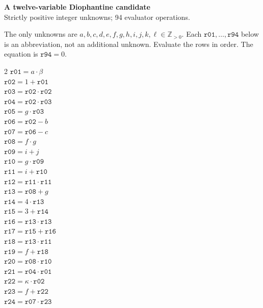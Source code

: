 \documentclass[10pt]{article}
\begin{document}
\begin{center}
{\large\bfseries A twelve-variable Diophantine candidate}\\
{\small Strictly positive integer unknowns; 94 evaluator operations.}
\end{center}
The only unknowns are \(a,b,c,d,e,f,g,h,i,j,k,\ell\in\mathbb Z_{>0}\).
Each \(\mathtt{r01},\ldots,\mathtt{r94}\) below is an abbreviation,
not an additional unknown. Evaluate the rows in order. The equation is
\(\boxed{\mathtt{r94}=0}\).

\begin{multicols}{2}\small
\(\mathtt{r01} = a \cdot \beta\)\\
\(\mathtt{r02} = 1 + \mathtt{r01}\)\\
\(\mathtt{r03} = \mathtt{r02} \cdot \mathtt{r02}\)\\
\(\mathtt{r04} = \mathtt{r02} \cdot \mathtt{r03}\)\\
\(\mathtt{r05} = g \cdot \mathtt{r03}\)\\
\(\mathtt{r06} = \mathtt{r02} - b\)\\
\(\mathtt{r07} = \mathtt{r06} - c\)\\
\(\mathtt{r08} = f \cdot g\)\\
\(\mathtt{r09} = i + j\)\\
\(\mathtt{r10} = g \cdot \mathtt{r09}\)\\
\(\mathtt{r11} = i + \mathtt{r10}\)\\
\(\mathtt{r12} = \mathtt{r11} \cdot \mathtt{r11}\)\\
\(\mathtt{r13} = \mathtt{r08} + g\)\\
\(\mathtt{r14} = 4 \cdot \mathtt{r13}\)\\
\(\mathtt{r15} = 3 + \mathtt{r14}\)\\
\(\mathtt{r16} = \mathtt{r13} \cdot \mathtt{r13}\)\\
\(\mathtt{r17} = \mathtt{r15} + \mathtt{r16}\)\\
\(\mathtt{r18} = \mathtt{r13} \cdot \mathtt{r11}\)\\
\(\mathtt{r19} = f + \mathtt{r18}\)\\
\(\mathtt{r20} = \mathtt{r08} \cdot \mathtt{r10}\)\\
\(\mathtt{r21} = \mathtt{r04} \cdot \mathtt{r01}\)\\
\(\mathtt{r22} = \kappa \cdot \mathtt{r02}\)\\
\(\mathtt{r23} = f + \mathtt{r22}\)\\
\(\mathtt{r24} = \mathtt{r07} \cdot \mathtt{r23}\)\\

\end{multicols}
\end{document}
